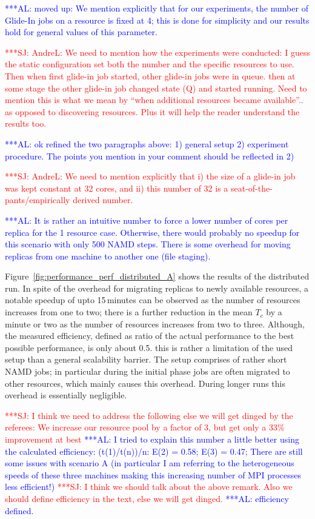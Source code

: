 \documentclass{rspublic}
\newcommand{\alnote}[1]{ {\textcolor{blue} { ***AL: #1 }}}
\newcommand{\jhanote}[1]{ {\textcolor{red} { ***SJ: #1 }}}
\newcommand{\alnote}[1]{}
\newcommand{\jhanote}[1]{}
\begin{document}
\alnote{moved up: We mention explicitly that for our experiments, the
  number of Glide-In jobs on a resource is fixed at 4; this is done
  for simplicity and our results hold for general values of this
  parameter.}

\jhanote{AndreL: We need to mention how the experiments were
  conducted: I guess the static configuration set both the number and
  the specific resources to use. Then when first glide-in job started,
  other glide-in jobs were in queue. then at some stage the other
  glide-in job changed state (Q) and started running. Need to mention
  this is what we mean by ``when additional resources became
  available''.. as opposed to discovering resources. Plus it will help
  the reader understand the results too.}

\alnote{ok refined the two paragraphs above: 1) general setup 2)
  experiment procedure. The points you mention in your comment should
  be reflected in 2)}

\jhanote{AndreL: We need to mention explicitly that i) the size of a
  glide-in job was kept constant at 32 cores, and ii) this number of
  32 is a seat-of-the-pants/empirically derived number.}

\alnote{It is rather an intuitive number to force a lower number of
  cores per replica for the 1 resource case. Otherwise, there would
  probably no speedup for this scenario with only 500 NAMD
  steps. There is some overhead for moving replicas from one machine
  to another one (file staging).}

Figure~\ref{fig:performance_perf_distributed_A} shows the results of
the distributed run. In spite of the overhead for migrating replicas
to newly available resources, a notable speedup of upto 15\,minutes
can be observed as the number of resources increases from one to two;
there is a further reduction in the mean $T_c$ by a minute or two as
the number of resources increases from two to three.  Although, the
measured efficiency, defined as ratio of the actual performance to the
best possible performance, is only about 0.5.  this is rather a
limitation of the used setup than a general scalability barrier.  The
setup comprises of rather short NAMD jobs; in particular during the
initial phase jobs are often migrated to other resources, which mainly
causes this overhead. During longer runs this overhead is essentially
negligible.

\jhanote{I think we need to address
  the following else we will get dinged by the referees: We increase
  our resource pool by a factor of 3, but get only a 33\% improvement
  at best} \alnote{I tried to explain this number a little better
  using the calculated efficiency: (t(1)/t(n))/n: E(2) = 0.58; E(3) =
  0.47; There are still some issues with scenario A (in particular I
  am referring to the heterogeneous speeds of these three machines
  making this increasing number of MPI processes less efficient!)}
\jhanote{I think we should talk about the above remark. Also we should
  define efficiency in the text, else we will get dinged.}  
\alnote{efficiency defined.}
\end{document}
